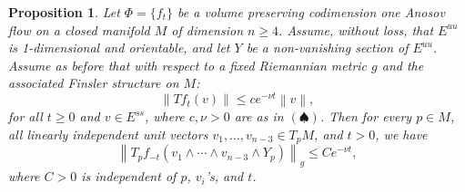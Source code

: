 \documentclass[11pt,letterpaper,reqno,abstract=true]{scrartcl}
\theoremstyle{plain}                              %
\newtheorem{prop}[thm]{Proposition}
\theoremstyle{definition}                         %
\theoremstyle{remark}                             %
\providecommand{\norm}[1]{\left\lVert#1\right\rVert}       %
\begin{document}
\begin{prop} \label{prop:exp-contr}
%
  Let $\Phi = \{ f_t \}$ be a volume preserving codimension one Anosov
  flow on a closed manifold $M$ of dimension $n \geq 4$. Assume, without
  loss, that $E^{uu}$ is 1-dimensional and orientable, and let $Y$ be a
  non-vanishing section of $E^{uu}$. Assume as before that with
  respect to a fixed Riemannian metric $g$ and the associated Finsler
  structure on $M$:
%
  \begin{displaymath}
    \norm{T f_t(v)} \leq c e^{-\nu t} \norm{v},
  \end{displaymath}
%
  for all $t \geq 0$ and $v \in E^{ss}$, where $c, \nu > 0$ are as in
  $(\spadesuit)$. Then for every $p \in M$, all linearly independent
  unit vectors $v_1, \ldots, v_{n-3} \in T_p M$, and $t > 0$, we have
%
  \begin{displaymath}
    \norm{T_p f_{-t} \left( v_1 \wedge \cdots \wedge v_{n-3}
      \wedge Y_p \right)}_g \leq C e^{-\nu t},
  \end{displaymath}
%
  where $C > 0$ is independent of $p$,
$v_i$'s, and $t$.
%
\end{prop}
\end{document}

